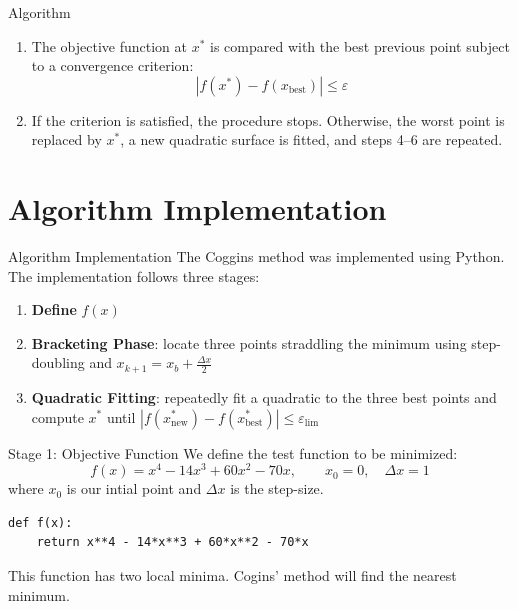 \documentclass{beamer}
\begin{document}
\begin{frame}[allowframebreaks]{Algorithm}
\begin{enumerate}
    \item The objective function at $x^*$ is compared with the best
    previous point subject to a convergence criterion:
    \begin{equation}
        |f(x^*) - f(x_{\text{best}})| \leq \varepsilon
    \end{equation}

    \item If the criterion is satisfied, the procedure stops.
    Otherwise, the worst point is replaced by $x^*$, a new quadratic
    surface is fitted, and steps 4--6 are repeated.
\end{enumerate}
 
\end{frame}



\section{Algorithm Implementation}
\begin{frame}{Algorithm Implementation}
  The Coggins method was implemented using Python.
  The implementation follows three stages:

  \bigskip
  \begin{enumerate}
    \item \textbf{Define} $f(x)$
    \item \textbf{Bracketing Phase}: locate three points straddling
      the minimum using step-doubling and $x_{k+1} = x_b +
      \frac{\Delta x}{2}$
    \item \textbf{Quadratic Fitting}: repeatedly fit a quadratic
      to the three best points and compute $x^*$ until
      $|f(x^*_{\text{new}}) - f(x^*_{\text{best}})| \leq
      \varepsilon_{\lim}$
  \end{enumerate}
\end{frame}

\begin{frame}[fragile]{Stage 1: Objective Function}
  We define the test function to be minimized:
  \[
    f(x) = x^4 - 14x^3 + 60x^2 - 70x, \qquad x_0 = 0,
    \quad \Delta x = 1
  \]
  where $x_0$ is our intial point and $\Delta x$ is the step-size.
  \begin{lstlisting}
def f(x):
    return x**4 - 14*x**3 + 60*x**2 - 70*x
\end{lstlisting}

  \bigskip
  This function has two local minima. Cogins' method will find the nearest minimum.
  
\end{frame}
\end{document}
